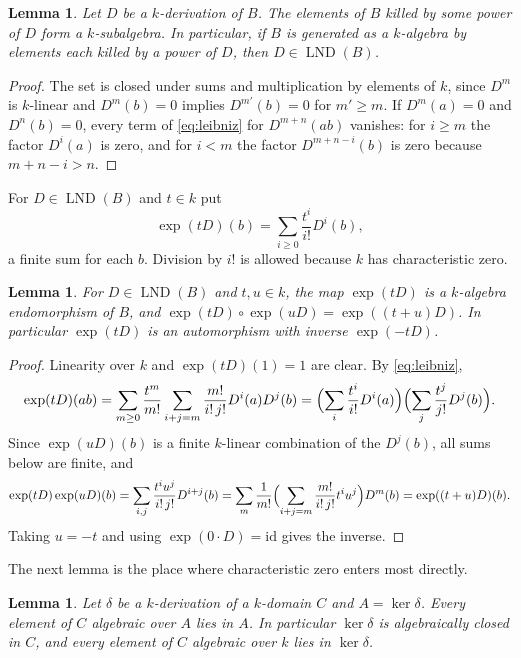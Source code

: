\documentclass[11pt]{amsart}
\newtheorem{lemma}[theorem]{Lemma}
\theoremstyle{definition}
\DeclareMathOperator{\LND}{LND}
\begin{document}
\begin{lemma}\label{lem:generators}
Let $D$ be a $k$-derivation of $B$. The elements of $B$ killed by some power of $D$ form a $k$-subalgebra. In particular, if $B$ is generated as a $k$-algebra by elements each killed by a power of $D$, then $D\in\LND(B)$.
\end{lemma}

\begin{proof}
The set is closed under sums and multiplication by elements of $k$, since $D^m$ is $k$-linear and $D^m(b)=0$ implies $D^{m'}(b)=0$ for $m'\ge m$. If $D^m(a)=0$ and $D^n(b)=0$, every term of \eqref{eq:leibniz} for $D^{m+n}(ab)$ vanishes: for $i\ge m$ the factor $D^i(a)$ is zero, and for $i<m$ the factor $D^{m+n-i}(b)$ is zero because $m+n-i>n$.
\end{proof}

For $D\in\LND(B)$ and $t\in k$ put
\[
\exp(tD)(b)=\sum_{i\ge0}\frac{t^i}{i!}D^i(b),
\]
a finite sum for each $b$. Division by $i!$ is allowed because $k$ has characteristic zero.

\begin{lemma}\label{lem:exp}
For $D\in\LND(B)$ and $t,u\in k$, the map $\exp(tD)$ is a $k$-algebra endomorphism of $B$, and $\exp(tD)\circ\exp(uD)=\exp((t+u)D)$. In particular $\exp(tD)$ is an automorphism with inverse $\exp(-tD)$.
\end{lemma}

\begin{proof}
Linearity over $k$ and $\exp(tD)(1)=1$ are clear. By \eqref{eq:leibniz},
\[
\exp(tD)(ab)=\sum_{m\ge0}\frac{t^m}{m!}\sum_{i+j=m}\frac{m!}{i!\,j!}D^i(a)D^j(b)=\Bigl(\sum_{i}\frac{t^i}{i!}D^i(a)\Bigr)\Bigl(\sum_j\frac{t^j}{j!}D^j(b)\Bigr).
\]
Since $\exp(uD)(b)$ is a finite $k$-linear combination of the $D^j(b)$, all sums below are finite, and
\[
\exp(tD)\exp(uD)(b)=\sum_{i,j}\frac{t^iu^j}{i!\,j!}D^{i+j}(b)=\sum_{m}\frac{1}{m!}\Bigl(\sum_{i+j=m}\frac{m!}{i!\,j!}t^iu^j\Bigr)D^m(b)=\exp((t+u)D)(b).
\]
Taking $u=-t$ and using $\exp(0\cdot D)=\mathrm{id}$ gives the inverse.
\end{proof}

The next lemma is the place where characteristic zero enters most directly.

\begin{lemma}\label{lem:algclosed}
Let $\delta$ be a $k$-derivation of a $k$-domain $C$ and $A=\ker\delta$. Every element of $C$ algebraic over $A$ lies in $A$. In particular $\ker\delta$ is algebraically closed in $C$, and every element of $C$ algebraic over $k$ lies in $\ker\delta$.
\end{lemma}
\end{document}
